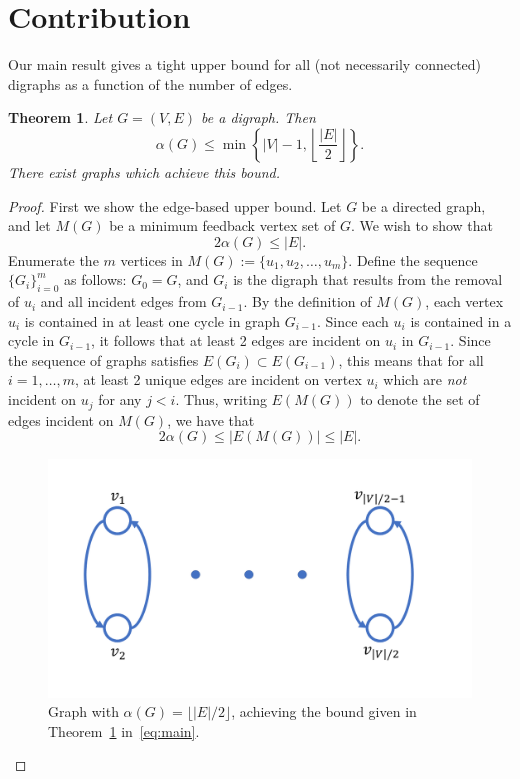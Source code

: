 \documentclass[preprint,12pt]{elsarticle}
\newtheorem{theorem}{Theorem}
\begin{document}
\section{Contribution}


Our main result gives a tight upper bound for all (not necessarily connected) digraphs as a function of the number of edges.
\begin{theorem}\label{thm:main}
Let $G=(V,E)$ be a digraph.
Then
\begin{equation}\label{eq:main}
\alpha(G) \leq \min\left\{|V|-1,\left\lfloor\frac{|E|}{2}\right\rfloor\right\}.
\end{equation}
There exist graphs which achieve this bound.
\end{theorem}

\begin{proof}
First we show the edge-based upper bound.
Let $G$ be a directed graph, and let $M(G)$ be a minimum feedback vertex set of $G$.
We wish to show that 
\begin{equation}
2\alpha(G)\leq |E|.
\end{equation}
Enumerate the $m$ vertices in $M(G):=\{u_1,u_2,\ldots,u_m\}$.
Define the sequence $\{G_i\}_{i=0}^m$ as follows: $G_0=G$, and $G_i$ is the digraph that results from the removal of $u_i$ and all incident edges from $G_{i-1}$.
By the definition of $M(G)$, each vertex $u_i$ is contained in at least one cycle in graph $G_{i-1}$.
Since each $u_i$ is contained in a cycle in $G_{i-1}$, it follows that at least 2 edges are incident on $u_i$ in $G_{i-1}$.
Since the sequence of graphs satisfies $E(G_{i})\subset E(G_{i-1})$, this means that for all $i=1,\ldots,m$, at least 2 unique edges are incident on vertex $u_i$ which are \emph{not} incident on $u_j$ for any $j<i$.
%
Thus, writing $E(M(G))$ to denote the set of edges incident on $M(G)$, we have that
\begin{equation}
2\alpha(G)\leq|E(M(G))|\leq |E|.
\end{equation}

\begin{figure}[h]
\centering
\includegraphics[width=.75\textwidth]{gfx/graph}
\caption{\label{fig:graph} Graph with $\alpha(G)=\lfloor|E|/2\rfloor$, achieving the bound given in Theorem~\ref{thm:main} in~\eqref{eq:main}.}
\end{figure}


\end{proof}
\end{document}
